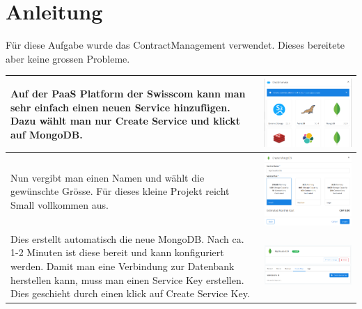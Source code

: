 \section{Anleitung}
Für diese Aufgabe wurde das ContractManagement verwendet. Dieses bereitete aber keine grossen Probleme.
\begin{longtable}{| p{5cm} | p{11cm} |}
\hline
Auf der PaaS Platform der Swisscom kann man sehr einfach einen neuen Service hinzufügen. Dazu wählt man nur Create Service und klickt auf MongoDB. &\includegraphics[width=0.65\columnwidth, valign=T]{images/mongodbexample/image1.png}
 \\ \hline
 Nun vergibt man einen Namen und wählt die gewünschte Grösse. Für dieses kleine Projekt reicht Small vollkommen aus.
&\includegraphics[width=0.4\columnwidth, valign=T]{images/mongodbexample/image2.png}
 \\ \hline
Dies erstellt automatisch die neue MongoDB. Nach ca. 1-2 Minuten ist diese bereit und kann konfiguriert werden. Damit man eine Verbindung zur Datenbank herstellen kann, muss man einen Service Key erstellen. Dies geschieht durch einen klick auf Create Service Key.
&\includegraphics[width=0.65\columnwidth, valign=T]{images/mongodbexample/image3.png}

\end{longtable}
